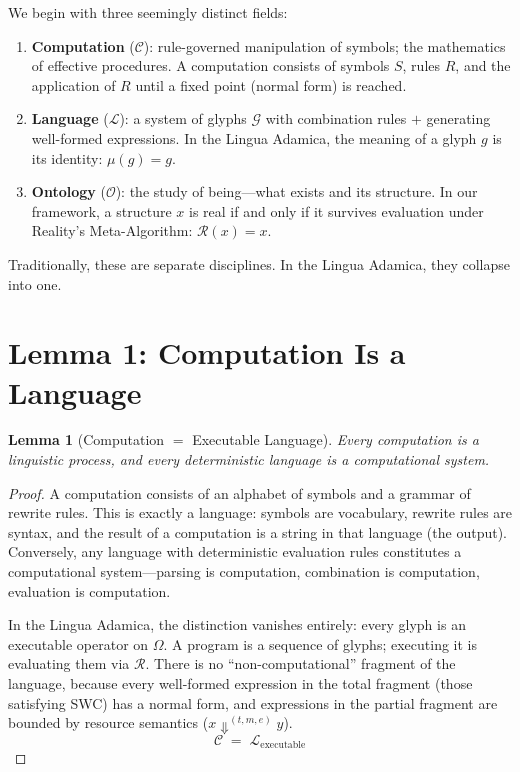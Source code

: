 \documentclass[12pt, letterpaper]{book}
\def\equiv{=}%
\def\oplus{+}%
\def\mathfrak#1{#1}%
\newtheorem{lemma}[theorem]{Lemma}
\begin{document}
We begin with three seemingly distinct fields:

\begin{enumerate}[label=(\roman*)]
    \item \textbf{Computation} ($\mathcal{C}$): rule-governed manipulation of symbols; the mathematics of effective procedures. A computation consists of symbols $S$, rules $R$, and the application of $R$ until a fixed point (normal form) is reached.
    \item \textbf{Language} ($\mathcal{L}$): a system of glyphs $\mathcal{G}$ with combination rules $\oplus$ generating well-formed expressions. In the Lingua Adamica, the meaning of a glyph $\mathfrak{g}$ is its identity: $\mu(\mathfrak{g}) \equiv \mathfrak{g}$.
    \item \textbf{Ontology} ($\mathcal{O}$): the study of being---what exists and its structure. In our framework, a structure $x$ is real if and only if it survives evaluation under Reality's Meta-Algorithm: $\mathcal{R}(x) = x$.
\end{enumerate}

Traditionally, these are separate disciplines. In the Lingua Adamica, they collapse into one.

\section{Lemma 1: Computation Is a Language}

\begin{lemma}[Computation $\equiv$ Executable Language]\label{lem:comp-is-lang}
Every computation is a linguistic process, and every deterministic language is a computational system.
\end{lemma}

\begin{proof}
A computation consists of an alphabet of symbols and a grammar of rewrite rules. This is exactly a language: symbols are vocabulary, rewrite rules are syntax, and the result of a computation is a string in that language (the output). Conversely, any language with deterministic evaluation rules constitutes a computational system---parsing is computation, combination is computation, evaluation is computation.

In the Lingua Adamica, the distinction vanishes entirely: every glyph is an executable operator on $\Omega$. A program is a sequence of glyphs; executing it is evaluating them via $\mathcal{R}$. There is no ``non-computational'' fragment of the language, because every well-formed expression in the total fragment (those satisfying SWC) has a normal form, and expressions in the partial fragment are bounded by resource semantics ($x \Downarrow^{(t,m,e)} y$).
\[
\mathcal{C} \;\equiv\; \mathcal{L}_{\mathrm{executable}}
\]
\end{proof}
\end{document}
